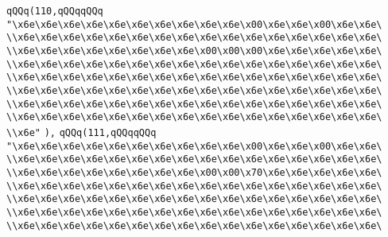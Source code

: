 \verb|qQQq(110,qQQqqQQq|\newline
\verb|"\x6e\x6e\x6e\x6e\x6e\x6e\x6e\x6e\x6e\x6e\x00\x6e\x6e\x00\x6e\x6e\|\newline
\verb|\\x6e\x6e\x6e\x6e\x6e\x6e\x6e\x6e\x6e\x6e\x6e\x6e\x6e\x6e\x6e\x6e\|\newline
\verb|\\x6e\x6e\x6e\x6e\x6e\x6e\x6e\x6e\x00\x00\x00\x6e\x6e\x6e\x6e\x6e\|\newline
\verb|\\x6e\x6e\x6e\x6e\x6e\x6e\x6e\x6e\x6e\x6e\x6e\x6e\x6e\x6e\x6e\x6e\|\newline
\verb|\\x6e\x6e\x6e\x6e\x6e\x6e\x6e\x6e\x6e\x6e\x6e\x6e\x6e\x6e\x6e\x6e\|\newline
\verb|\\x6e\x6e\x6e\x6e\x6e\x6e\x6e\x6e\x6e\x6e\x6e\x6e\x6e\x6e\x6e\x6e\|\newline
\verb|\\x6e\x6e\x6e\x6e\x6e\x6e\x6e\x6e\x6e\x6e\x6e\x6e\x6e\x6e\x6e\x6e\|\newline
\verb|\\x6e\x6e\x6e\x6e\x6e\x6e\x6e\x6e\x6e\x6e\x6e\x6e\x6e\x6e\x6e\x6e\|\newline
\verb|\\x6e"|\newline
\verb|),|\newline
\verb|qQQq(111,qQQqqQQq|\newline
\verb|"\x6e\x6e\x6e\x6e\x6e\x6e\x6e\x6e\x6e\x6e\x00\x6e\x6e\x00\x6e\x6e\|\newline
\verb|\\x6e\x6e\x6e\x6e\x6e\x6e\x6e\x6e\x6e\x6e\x6e\x6e\x6e\x6e\x6e\x6e\|\newline
\verb|\\x6e\x6e\x6e\x6e\x6e\x6e\x6e\x6e\x00\x00\x70\x6e\x6e\x6e\x6e\x6e\|\newline
\verb|\\x6e\x6e\x6e\x6e\x6e\x6e\x6e\x6e\x6e\x6e\x6e\x6e\x6e\x6e\x6e\x6e\|\newline
\verb|\\x6e\x6e\x6e\x6e\x6e\x6e\x6e\x6e\x6e\x6e\x6e\x6e\x6e\x6e\x6e\x6e\|\newline
\verb|\\x6e\x6e\x6e\x6e\x6e\x6e\x6e\x6e\x6e\x6e\x6e\x6e\x6e\x6e\x6e\x6e\|\newline
\verb|\\x6e\x6e\x6e\x6e\x6e\x6e\x6e\x6e\x6e\x6e\x6e\x6e\x6e\x6e\x6e\x6e\|\newline
